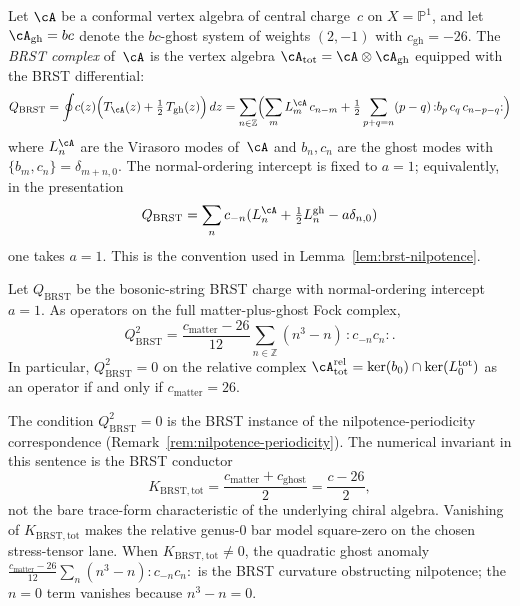 Let $\cA$ be a conformal vertex algebra of central charge~$c$ on
$X = \mathbb{P}^1$, and let $\cA_{\mathrm{gh}} = bc$ denote the
$bc$-ghost system of weights $(2, -1)$ with $c_{\mathrm{gh}} = -26$.
The \emph{BRST complex} of~$\cA$ is the vertex algebra
$\cA_{\mathrm{tot}} = \cA \otimes \cA_{\mathrm{gh}}$ equipped with
the BRST differential:
\begin{equation}\label{eq:brst-differential}
Q_{\mathrm{BRST}}
= \oint \! c(z)\Bigl(T_{\cA}(z) + \tfrac{1}{2}\,T_{\mathrm{gh}}(z)\Bigr)\,dz
= \sum_{n \in \mathbb{Z}} \Bigl(
 \sum_m L^{\cA}_m\, c_{n-m}
 + \tfrac{1}{2}\sum_{p+q=n}(p-q)\, {:}b_p\, c_q\, c_{n-p-q}{:}
\Bigr)
\end{equation}
where $L^{\cA}_n$ are the Virasoro modes of~$\cA$ and $b_n, c_n$ are
the ghost modes with $\{b_m, c_n\} = \delta_{m+n,0}$. The
normal-ordering intercept is fixed to $a=1$; equivalently, in the
presentation
\[
Q_{\mathrm{BRST}}
=\sum_n c_{-n}(L_n^\cA+\tfrac12L_n^{\mathrm{gh}}-a\delta_{n,0})
\]
one takes
$a=1$. This is the convention used in
Lemma~\ref{lem:brst-nilpotence}.

\begin{lemma}
\label{lem:brst-nilpotence}
Let $Q_{\mathrm{BRST}}$ be the bosonic-string BRST charge with
normal-ordering intercept $a=1$. As operators on the full
matter-plus-ghost Fock complex,
\[
 Q_{\mathrm{BRST}}^2
 =
 \frac{c_{\mathrm{matter}}-26}{12}
 \sum_{n\in\mathbb Z}(n^3-n)\,{:}c_{-n}c_n{:}.
\]
In particular, $Q_{\mathrm{BRST}}^2 = 0$ on the relative complex
$\cA_{\mathrm{tot}}^{\mathrm{rel}} = \ker(b_0) \cap \ker(L_0^{\mathrm{tot}})$
as an operator if and only if $c_{\mathrm{matter}}=26$.
\end{lemma}

\begin{remark}
\label{rem:brst-nilpotence-periodicity}
The condition $Q_{\mathrm{BRST}}^2=0$ is the BRST instance of the
nilpotence-periodicity correspondence
(Remark~\ref{rem:nilpotence-periodicity}). The numerical invariant in
this sentence is the BRST conductor
\[
 K_{\mathrm{BRST,tot}}
 =\frac{c_{\mathrm{matter}}+c_{\mathrm{ghost}}}{2}
 =\frac{c-26}{2},
\]
not the bare trace-form characteristic of the underlying chiral
algebra. Vanishing of $K_{\mathrm{BRST,tot}}$ makes the relative
genus-$0$ bar model square-zero on the chosen stress-tensor lane. When
$K_{\mathrm{BRST,tot}}\neq0$, the quadratic ghost anomaly
$\frac{c_{\mathrm{matter}}-26}{12}
\sum_n(n^3-n){:}c_{-n}c_n{:}$ is the BRST curvature
obstructing nilpotence; the $n=0$ term vanishes because
$n^3-n=0$.
\end{remark}

